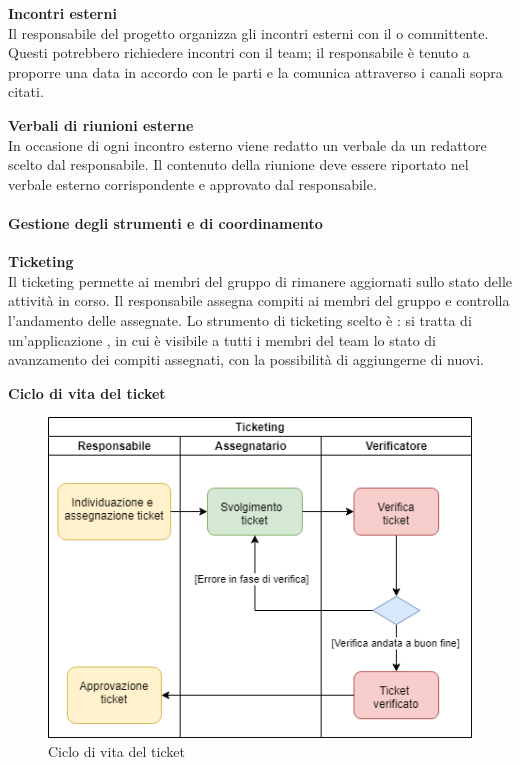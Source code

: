 \mbox{}

\textbf{Incontri esterni} \\
Il responsabile del progetto organizza gli incontri esterni con il  o committente. Questi potrebbero richiedere incontri con il team; il responsabile è tenuto a proporre una data in accordo con le parti e la comunica attraverso i canali sopra citati.\\

\mbox{}

\textbf{Verbali di riunioni esterne} \\
In occasione di ogni incontro esterno viene redatto un verbale da un redattore scelto dal responsabile. Il contenuto della riunione deve essere riportato nel verbale esterno corrispondente e approvato dal responsabile.


\paragraph{Gestione degli strumenti e di coordinamento}

\textbf{Ticketing} \\
Il ticketing permette ai membri del gruppo di rimanere aggiornati sullo stato delle attività in corso. Il responsabile assegna compiti ai membri del gruppo e controlla l'andamento delle  assegnate. Lo strumento di ticketing scelto è : si tratta di un'applicazione , in cui è visibile a tutti i membri del team lo stato di avanzamento dei compiti assegnati, con la possibilità di aggiungerne di nuovi. 

\mbox{}

\textbf{Ciclo di vita del ticket} 
\begin{figure}[!htb]
     \centering
     \includegraphics[scale=0.8]{Images/ticket.png}
     \caption{Ciclo di vita del ticket}
\end{figure}


